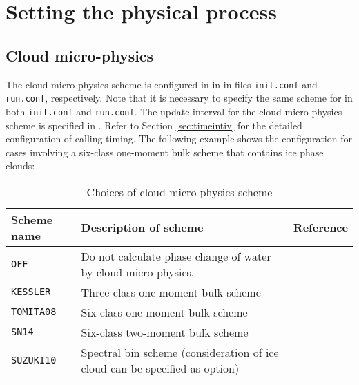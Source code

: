 \section{Setting the physical process} \label{sec:basic_usel_physics}

\subsection{Cloud micro-physics} \label{subsec:basic_usel_microphys}
The cloud micro-physics scheme is configured in  in  in files \verb|init.conf| and \verb|run.conf|, respectively.
{\color{blue} Note that it is necessary to specify the same scheme for  in both \texttt{init.conf} and \texttt{run.conf}}.
The update interval for the cloud micro-physics scheme is specified in . Refer to Section \ref{sec:timeintiv} for the detailed configuration of calling timing. The following example shows the configuration for cases involving a six-class one-moment bulk scheme that contains ice phase clouds:


\begin{table}[tbh]
\begin{center}
  \caption{Choices of cloud micro-physics scheme}
  \label{tab:nml_atm_mp}
  \begin{tabularx}{150mm}{lXX} \hline
    \rowcolor[gray]{0.9}  Scheme name & Description of scheme & Reference\\ \hline
     \verb|OFF|      & Do not calculate phase change of water by cloud micro-physics. &  \\
     \verb|KESSLER|  & Three-class one-moment bulk scheme & \citet{kessler_1969} \\
     \verb|TOMITA08| & Six-class one-moment bulk scheme & \citet{tomita_2008} \\
     \verb|SN14|     & Six-class two-moment bulk scheme & \citet{sn_2014} \\
     \verb|SUZUKI10| & Spectral bin scheme (consideration of ice cloud can be specified as option) & \citet{suzuki_etal_2010} \\
    \hline
  \end{tabularx}
\end{center}
\end{table}

